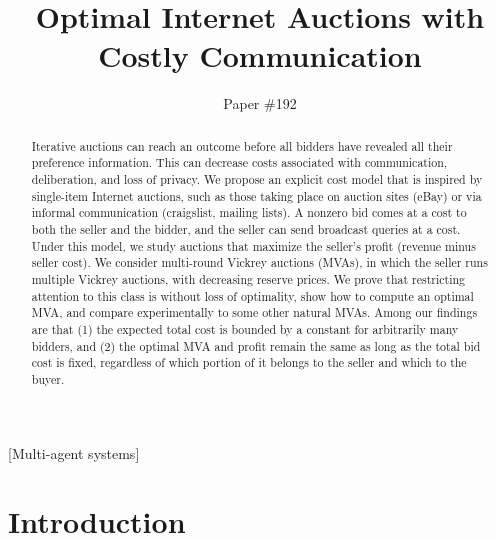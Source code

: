 \documentclass{aamas2013}
\begin{document}
\title{Optimal Internet Auctions with Costly Communication}


\author{ Paper \#192 }


\maketitle

\begin{abstract}
Iterative auctions can reach an outcome before all bidders have 
revealed all their preference information.  This can decrease costs
associated with communication, deliberation, and loss of privacy.
We propose an explicit cost model that is inspired by single-item
Internet auctions, such as those taking place on auction sites (eBay)
or via informal communication (craigslist, mailing lists). 
A nonzero bid comes at a cost to both the seller and the bidder, and
the seller can send broadcast queries at a cost.
Under this model, we study auctions that maximize the seller's profit 
(revenue minus seller cost).
We consider multi-round Vickrey auctions (MVAs), in which the seller
runs multiple Vickrey auctions, with decreasing reserve prices.
We prove that restricting attention to this class is without loss of
optimality, show how to compute an optimal MVA, and compare
experimentally to some other natural MVAs.
Among our findings are that (1) the expected total cost is bounded
by a constant for arbitrarily many bidders, and (2) the optimal MVA
and profit remain
the same as long as the total bid cost is fixed, regardless of which
portion of it belongs to the seller and which to the buyer.
\end{abstract}

[Multi-agent systems]



\section{Introduction}
\end{document}
